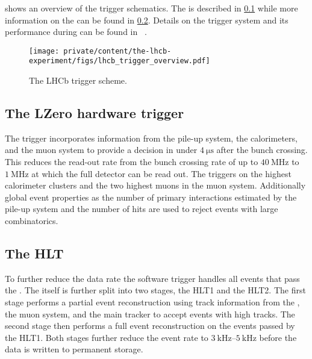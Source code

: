  shows an overview of the \LHCb
trigger schematics. The \LZero is described in
\cref{sec:lhcb_experiment:trigger:lzero} while more information on the \HLT can
be found in \cref{sec:lhcb_experiment:trigger:hlt}. Details on the \LHCb trigger
system and its performance during \RunOne can be found in
\Refs~\cite{Aaij:2012me,Albrecht:2013fba}.
%
\begin{figure}[t]
  \centering
  \texttt{[image: private/content/the-lhcb-experiment/figs/lhcb\_trigger\_overview.pdf]}
  \caption{
    The \acs{LHCb} trigger scheme.
  }
  \label{fig:lhcb_experiment:trigger:overview}
\end{figure}

\subsection{The \acl*{LZero} hardware trigger}
\label{sec:lhcb_experiment:trigger:lzero}

The \LZero trigger incorporates information from the \VELO pile-up system, the
calorimeters, and the muon system to provide a decision in under
$\SI{4}{\micro\second}$ after the bunch crossing. This reduces the read-out rate
from the \LHC bunch crossing rate of up to $\SI{40}{\mega\hertz}$ to
$\SI{1}{\mega\hertz}$ at which the full detector can be read out. The \LZero
triggers on the highest \ET calorimeter clusters and the two highest \pT muons
in the muon system. Additionally global event properties as the number of
primary \protonproton interactions estimated by the \VELO pile-up system and the
number of \SPD hits are used to reject events with large combinatorics.

\newpage
\subsection{The \acl*{HLT}}
\label{sec:lhcb_experiment:trigger:hlt}

To further reduce the data rate the \HLT software trigger handles all events
that pass the \LZero. The \HLT itself is further split into two stages, the
\acs{HLT}1 and the \acs{HLT}2. The first stage performs a partial event
reconstruction using track information from the \VELO, the muon system, and the
main tracker to accept events with high \pT tracks. The second \HLT stage then
performs a full event reconstruction on the events passed by the \acs{HLT}1.
Both \HLT stages further reduce the event rate to $\SIrange[range-units =
single, range-phrase = -]{3}{5}{\kilo\hertz}$ before the data is written to
permanent storage.


